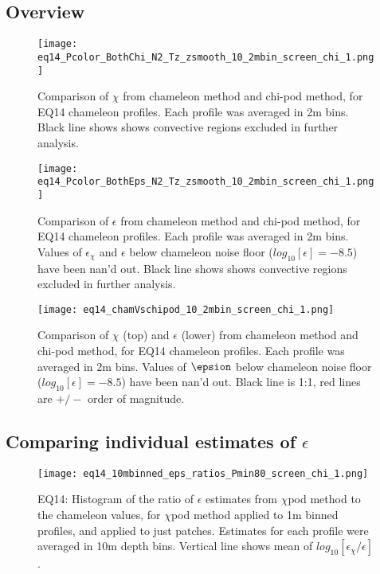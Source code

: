 \documentclass[11pt]{article}
\begin{document}
\subsection{Overview}

\begin{figure}[htbp]
\texttt{[image: eq14\_Pcolor\_BothChi\_N2\_Tz\_zsmooth\_10\_2mbin\_screen\_chi\_1.png]}
\caption{Comparison of $\chi$ from chameleon method and chi-pod method, for EQ14 chameleon profiles. Each profile was averaged in 2m bins.  Black line shows shows convective regions excluded in further analysis.}
\label{chi_overview}
\end{figure}

\begin{figure}[htbp]
\texttt{[image: eq14\_Pcolor\_BothEps\_N2\_Tz\_zsmooth\_10\_2mbin\_screen\_chi\_1.png]}
\caption{Comparison of $\epsilon$ from chameleon method and chi-pod method, for EQ14 chameleon profiles. Each profile was averaged in 2m bins.  Values of $\epsilon_{\chi}$ and $\epsilon$ below chameleon noise floor ($log_{10}[\epsilon]=-8.5$) have been nan'd out. Black line shows shows convective regions excluded in further analysis.}
\label{eps_overview}
\end{figure}



\begin{figure}[htbp]
\texttt{[image: eq14\_chamVschipod\_10\_2mbin\_screen\_chi\_1.png]}
\caption{Comparison of $\chi$ (top) and $\epsilon$ (lower) from chameleon method and chi-pod method, for EQ14 chameleon profiles. Each profile was averaged in 2m bins.  Values of $\epsion$ below chameleon noise floor ($log_{10}[\epsilon]=-8.5$) have been nan'd out. Black line is 1:1, red lines are $+/-$ order of magnitude. }
\label{chamVschi}
\end{figure}




\clearpage
\subsection{Comparing individual estimates of $\epsilon$}

\begin{figure}[htbp]
\texttt{[image: eq14\_10mbinned\_eps\_ratios\_Pmin80\_screen\_chi\_1.png]}
\caption{EQ14: Histogram of the ratio of $\epsilon$ estimates from $\chi$pod method to the chameleon values, for $\chi$pod method applied to 1m binned profiles, and applied to just patches. Estimates for each profile were averaged in 10m depth bins. Vertical line shows mean of $log_{10}[\epsilon_{\chi}/\epsilon]$.}
\label{epsrathist_eq14}
\end{figure}
\end{document}

